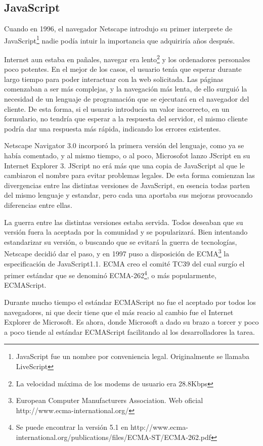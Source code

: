 \subsection{JavaScript}

Cuando en 1996, el navegador Netscape introdujo su primer interprete de
JavaScript\footnote{JavaScript fue un nombre por conveniencia legal. Originalmente se llamaba
  LiveScript} nadie podía intuir la importancia que adquiriría años después. 

Internet aun estaba en pañales, navegar era lento\footnote{La velocidad máxima de los modems de
  usuario era 28.8Kbps} y los ordenadores personales poco potentes. En el mejor de los casos, el
usuario tenía que esperar durante largo tiempo para poder interactuar con la web solicitada.  Las
páginas comenzaban a ser más complejas, y la navegación más lenta, de ello surguió la necesidad de
un lenguaje de programación que se ejecutará en el navegador del cliente. De esta forma, si el
usuario introducía un valor incorrecto, en un formulario, no tendría que esperar a la respuesta del
servidor, el mismo cliente podría dar una respuesta más rápida, indicando los errores existentes.

Netscape Navigator 3.0 incorporó la primera versión del lenguaje, como ya se había comentado, y al
mismo tiempo, o al poco, Microsofot lanzo JScript en su Internet Explorer 3. JScript no erá más que 
una copia de JavaScript al que le cambiaron el nombre para evitar problemas legales. De esta
forma comienzan las divergencias entre las distintas versiones de JavaScript, en esencia todas
parten del mismo lenguaje y estandar, pero cada una aportaba sus mejoras provocando diferencias
entre ellas. 

La guerra entre las distintas versiones estaba servida. Todos deseaban que su versión fuera la
aceptada por la comunidad y se popularizará. Bien intentando estandarizar su versión, o buscando
que se evitará la guerra de tecnologías, Netscape decidió dar el paso, y en 1997 puso a disposición
de ECMA\footnote{European Computer Manufacturers Association. Web oficial
  http://www.ecma-international.org/} la especificación de JavaScript1.1. ECMA creo el comité TC39
del cual surgío el primer estándar que se denominó ECMA-262\footnote{Se puede encontrar la versión 5.1 en
  http://www.ecma-international.org/publications/files/ECMA-ST/ECMA-262.pdf}, o más popularmente, 
ECMAScript. 

Durante mucho tiempo el estándar ECMAScript no fue el aceptado por todos los navegadores, ni que
decir tiene que el más reacio al cambio fue el Internet Explorer de Microsoft. Es ahora, donde
Microsoft a dado su brazo a torcer y poco a poco tiende al estándar ECMAScript facilitando al los
desarrolladores la tarea.
